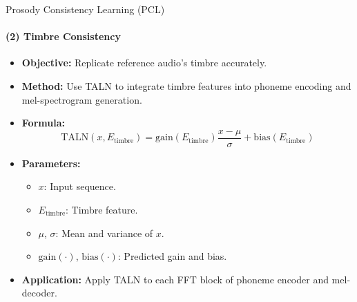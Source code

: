 \begin{frame}{Prosody Consistency Learning (PCL)}
\framesubtitle{(2) Timbre Consistency}
\begin{itemize}
    \item \textbf{Objective:} Replicate reference audio's timbre accurately.
    \item \textbf{Method:} Use TALN to integrate timbre features into phoneme encoding and mel-spectrogram generation.
    \item \textbf{Formula:}
    \begin{equation}
        \text{TALN}(x, E_{\text{timbre}}) = \text{gain}(E_{\text{timbre}}) \frac{x - \mu}{\sigma} + \text{bias}(E_{\text{timbre}})
    \end{equation}
    \item \textbf{Parameters:}
    \begin{itemize}
        \item \( x \): Input sequence.
        \item \( E_{\text{timbre}} \): Timbre feature.
        \item \( \mu \), \( \sigma \): Mean and variance of \( x \).
        \item \( \text{gain}(\cdot) \), \( \text{bias}(\cdot) \): Predicted gain and bias.
    \end{itemize}
    \item \textbf{Application:} Apply TALN to each FFT block of phoneme encoder and mel-decoder.
\end{itemize}
\end{frame}